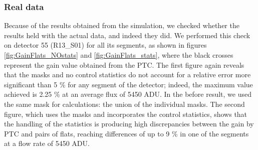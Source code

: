 \subsubsection{Real data} \label{subsubsec:results_gainflats_realdata}
 
 Because of the results obtained from the simulation, we checked whether the results held with the actual data, and indeed they did. We performed this check on detector 55 (R13\_S01) for all its segments, as shown in figures \ref{fig:GainFlats_NOstats} and \ref{fig:GainFlats_stats}, where the black crosses represent the gain value obtained from the PTC. The first figure again reveals that the masks and no control statistics do not account for a relative error more significant than 5 \% for any segment of the detector; indeed, the maximum value achieved is 2.25 \% at an average flux of 5450 ADU. In the before result, we used the same mask for calculations: the union of the individual masks. The second figure, which uses the masks and incorporates the control statistics, shows that the handling of the statistics is producing high discrepancies between the gain by PTC and pairs of flats, reaching differences of up to 9 \% in one of the segments at a flow rate of 5450 ADU.
 
 
